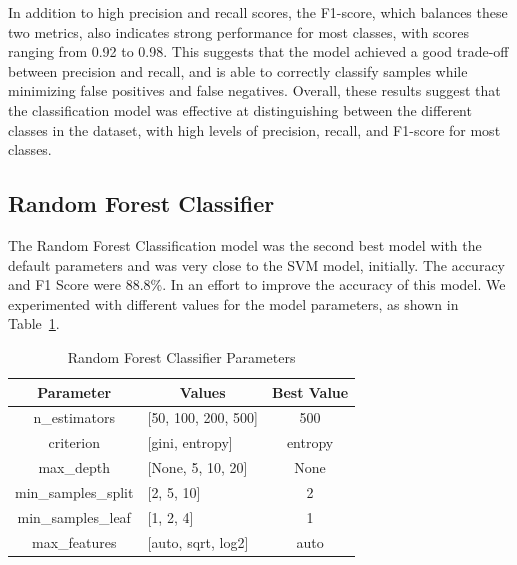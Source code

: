 \documentclass[conference]{IEEEtran}
\begin{document}
In addition to high precision and recall scores, the F1-score, which balances these two metrics, also indicates strong performance for most classes, with scores ranging from 0.92 to 0.98. This suggests that the model achieved a good trade-off between precision and recall, and is able to correctly classify samples while minimizing false positives and false negatives.
Overall, these results suggest that the classification model was effective at distinguishing between the different classes in the dataset, with high levels of precision, recall, and F1-score for most classes.

\subsection{Random Forest Classifier}
The Random Forest Classification model was the second best model with the default parameters and was very close to the SVM model, initially. 
The accuracy and F1 Score were 88.8\%. 
In an effort to improve the accuracy of this model. 
We experimented with different values for the model parameters, as shown in Table~\ref{tab:rf_parameters}.
\begin{table}[!h]
    \centering
    \begin{tabular}{|c|l|c|}
    \hline
    \textbf{Parameter} & \multicolumn{1}{c|}{\textbf{Values}}     & \multicolumn{1}{l|}{\textbf{Best Value}} \\ \hline
    n\_estimators       & {[}50, 100, 200, 500{]}                  & 500                                      \\ \hline
    criterion          & {[}gini, entropy{]}                      & entropy                                  \\ \hline
    max\_depth          & {[}None, 5, 10, 20{]}                    & None                                     \\ \hline
    min\_samples\_split  & {[}2, 5, 10{]}                           & 2                                   \\ \hline
    min\_samples\_leaf   & {[}1, 2, 4{]}                            & 1                                 \\ \hline
    max\_features       & {[}auto, sqrt, log2{]}                   & auto                                    \\ \hline
    \end{tabular}
    \caption{Random Forest Classifier Parameters \label{tab:rf_parameters}}
\end{table}
\end{document}
